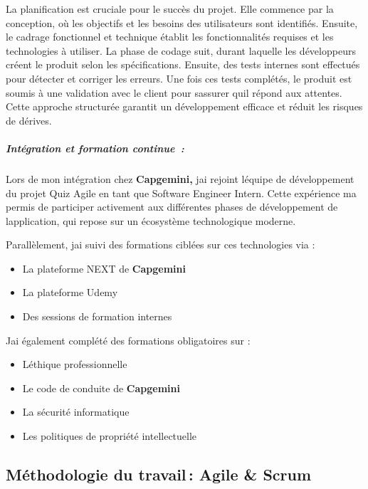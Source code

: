 \documentclass[12pt,a4paper,twoside]{report}
\begin{document}
La planification est cruciale pour le succès du projet. Elle commence
par la conception, où les objectifs et les besoins des utilisateurs sont
identifiés. Ensuite, le cadrage fonctionnel et technique établit les
fonctionnalités requises et les technologies à utiliser. La phase de
codage suit, durant laquelle les développeurs créent le produit selon
les spécifications. Ensuite, des tests internes sont effectués pour
détecter et corriger les erreurs. Une fois ces tests complétés, le
produit est soumis à une validation avec le client pour
s\textquotesingle assurer qu\textquotesingle il répond aux attentes.
Cette approche structurée garantit un développement efficace et réduit
les risques de dérives.

\hypertarget{intuxe9gration-et-formation-continue}{%
\subparagraph{Intégration et formation
continue~:}\label{intuxe9gration-et-formation-continue}}

Lors de mon intégration chez \textbf{Capgemini,} j\textquotesingle ai
rejoint l\textquotesingle équipe de développement du projet Quiz Agile
en tant que Software Engineer Intern. Cette expérience
m\textquotesingle a permis de participer activement aux différentes
phases de développement de l\textquotesingle application, qui repose sur
un écosystème technologique moderne.

Parallèlement, j\textquotesingle ai suivi des formations ciblées sur ces
technologies via :

\begin{itemize}
\item
  La plateforme NEXT de \textbf{Capgemini}
\item
  La plateforme Udemy
\item
  Des sessions de formation internes
\end{itemize}

J\textquotesingle ai également complété des formations obligatoires sur
:

\begin{itemize}
\item
  L\textquotesingle éthique professionnelle
\item
  Le code de conduite de \textbf{Capgemini}
\item
  La sécurité informatique
\item
  Les politiques de propriété intellectuelle
\end{itemize}

\hypertarget{muxe9thodologie-du-travail-agile-scrum}{%
\subsection{Méthodologie du travail\,: Agile \&
Scrum}\label{muxe9thodologie-du-travail-agile-scrum}}
\end{document}
